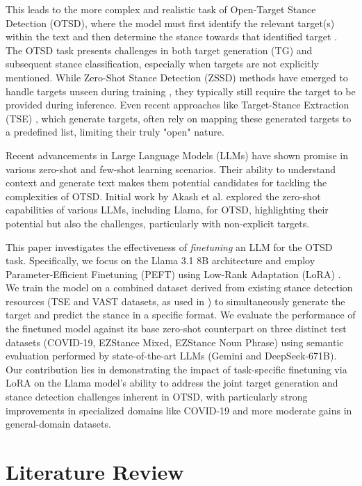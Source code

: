 \documentclass[twocolumn,11pt,letterpaper]{article}
\begin{document}
This leads to the more complex and realistic task of Open-Target Stance Detection (OTSD), where the model must first identify the relevant target(s) within the text and then determine the stance towards that identified target \cite{akash2024}. The OTSD task presents challenges in both target generation (TG) and subsequent stance classification, especially when targets are not explicitly mentioned. While Zero-Shot Stance Detection (ZSSD) methods have emerged to handle targets unseen during training \cite{vast}, they typically still require the target to be provided during inference. Even recent approaches like Target-Stance Extraction (TSE) \cite{tse}, which generate targets, often rely on mapping these generated targets to a predefined list, limiting their truly "open" nature.

Recent advancements in Large Language Models (LLMs) have shown promise in various zero-shot and few-shot learning scenarios. Their ability to understand context and generate text makes them potential candidates for tackling the complexities of OTSD. Initial work by Akash et al. \cite{akash2024} explored the zero-shot capabilities of various LLMs, including Llama, for OTSD, highlighting their potential but also the challenges, particularly with non-explicit targets.

This paper investigates the effectiveness of \textit{finetuning} an LLM for the OTSD task. Specifically, we focus on the Llama 3.1 8B architecture \cite{llama3.1} and employ Parameter-Efficient Finetuning (PEFT) using Low-Rank Adaptation (LoRA) \cite{lora}. We train the model on a combined dataset derived from existing stance detection resources (TSE and VAST datasets, as used in \cite{akash2024}) to simultaneously generate the target and predict the stance in a specific format. We evaluate the performance of the finetuned model against its base zero-shot counterpart on three distinct test datasets (COVID-19, EZStance Mixed, EZStance Noun Phrase) using semantic evaluation performed by state-of-the-art LLMs (Gemini and DeepSeek-671B). Our contribution lies in demonstrating the impact of task-specific finetuning via LoRA on the Llama model's ability to address the joint target generation and stance detection challenges inherent in OTSD, with particularly strong improvements in specialized domains like COVID-19 and more moderate gains in general-domain datasets.

\section{Literature Review}
\label{sec:literature}
\end{document}
